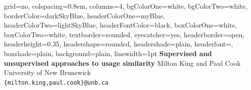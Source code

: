 \documentclass[paperwidth=80cm,paperheight=40cm,final]{baposter}
\begin{document}
\newlength{\leftimgwidth}
\begin{poster}%
  {
  grid=no,
  colspacing=0.8em,
  columns=4,
  bgColorOne=white,
  bgColorTwo=white,
  borderColor=darkSkyBlue,
  headerColorOne=myBlue,
  headerColorTwo=lightSkyBlue,
  headerFontColor=black,
  boxColorOne=white,
  boxColorTwo=white,
  textborder=rounded,
  eyecatcher=yes,
  headerborder=open,
  headerheight=0.35\textheight,
  headershape=rounded,
  headershade=plain,
  headerfont=\Large\textsc, %
  boxshade=plain,
  background=plain,
  linewidth=1pt
  }
  {
\hspace{35mm}
  }
  {\Large
    \textsf{\bfseries Supervised and unsupervised approaches to usage similarity}
  }
{\vspace{1mm}
\large
\sf Milton King and Paul Cook \\
University of New Brunswick\\
  {\tt \{milton.king,paul.cook\}@unb.ca} \vspace*{-2ex}
}
{
 \hspace{5mm}

%
%

}
\end{poster}
\end{document}

